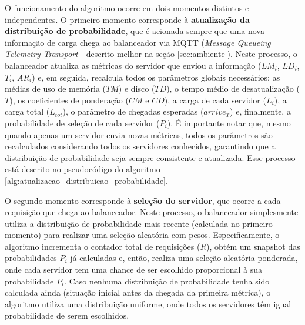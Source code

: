 O funcionamento do algoritmo ocorre em dois momentos distintos e independentes. O primeiro momento corresponde à \textbf{atualização da distribuição de probabilidade}, que é acionada sempre que uma nova informação de carga chega ao balanceador via MQTT (\textit{Message Queueing Telemetry Transport} - descrito melhor na seção \ref{sec:ambiente}). Neste processo, o balanceador atualiza as métricas do servidor que enviou a informação ($LM_i$, $LD_i$, $T_i$, $AR_i$) e, em seguida, recalcula todos os parâmetros globais necessários: as médias de uso de memória ($TM$) e disco ($TD$), o tempo médio de desatualização ($T$), os coeficientes de ponderação ($CM$ e $CD$), a carga de cada servidor ($L_i$), a carga total ($L_{tot}$), o parâmetro de chegadas esperadas ($arrive_T$) e, finalmente, a probabilidade de seleção de cada servidor ($P_i$). É importante notar que, mesmo quando apenas um servidor envia novas métricas, todos os parâmetros são recalculados considerando todos os servidores conhecidos, garantindo que a distribuição de probabilidade seja sempre consistente e atualizada. Esse processo está descrito no pseudocódigo do algoritmo \ref{alg:atualizacao_distribuicao_probabilidade}.

O segundo momento corresponde à \textbf{seleção do servidor}, que ocorre a cada requisição que chega ao balanceador. Neste processo, o balanceador simplesmente utiliza a distribuição de probabilidade mais recente (calculada no primeiro momento) para realizar uma seleção aleatória com pesos. Especificamente, o algoritmo incrementa o contador total de requisições ($R$), obtém um snapshot das probabilidades $P_i$ já calculadas e, então, realiza uma seleção aleatória ponderada, onde cada servidor tem uma chance de ser escolhido proporcional à sua probabilidade $P_i$. Caso nenhuma distribuição de probabilidade tenha sido calculada ainda (situação inicial antes da chegada da primeira métrica), o algoritmo utiliza uma distribuição uniforme, onde todos os servidores têm igual probabilidade de serem escolhidos.

